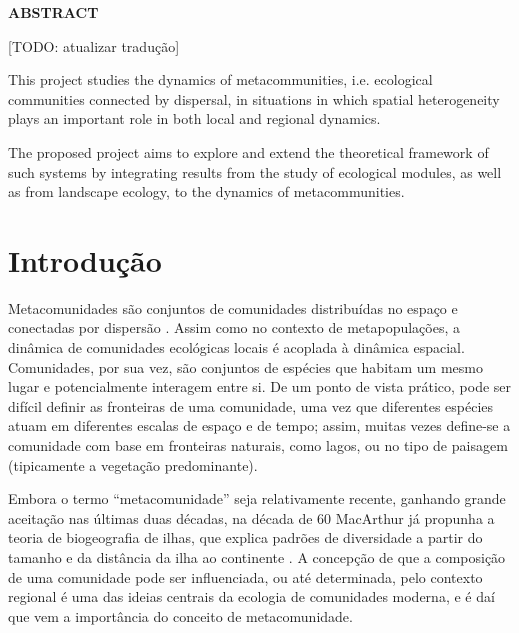 \documentclass[12pt]{extarticle}
\begin{document}
\newpage

\setlength{\parindent}{20pt}
\thispagestyle{empty}
\begin{center}
    \bf \Large \color{blue} ABSTRACT
\end{center}
\vskip 3.0cm
{\it

    [TODO: atualizar tradução]

    This project studies the dynamics of metacommunities, i.e.
    ecological communities connected by dispersal, in situations in which
    spatial heterogeneity plays an important role in both local and regional
    dynamics.

    The proposed project aims to explore and extend the theoretical framework
    of such systems by integrating results from the study of ecological modules,
    as well as from landscape ecology, to the dynamics of metacommunities.
}

\newpage
\setcounter{page}{1}
\onehalfspacing

\section{Introdução}

Metacomunidades são conjuntos de comunidades distribuídas no espaço e
conectadas por dispersão \citep{hanski1991, holyoak2005}. Assim como no
contexto de metapopulações, a dinâmica de comunidades ecológicas locais é
acoplada à dinâmica espacial.  Comunidades, por sua vez, são conjuntos de
espécies que habitam um mesmo lugar e potencialmente interagem entre si. De um
ponto de vista prático, pode ser difícil definir as fronteiras de uma
comunidade, uma vez que diferentes espécies atuam em diferentes escalas de
espaço e de tempo; assim, muitas vezes define-se a comunidade com base em
fronteiras naturais, como lagos, ou no tipo de paisagem (tipicamente a
vegetação predominante).

Embora o termo ``metacomunidade'' seja relativamente recente, ganhando grande
aceitação nas últimas duas décadas, na década de 60 MacArthur já propunha a
teoria de biogeografia de ilhas, que explica padrões de diversidade a partir
do tamanho e da distância da ilha ao continente \citep{macarthur1967}. A
concepção de que a composição de uma comunidade pode ser influenciada, ou até
determinada, pelo contexto regional é uma das ideias centrais da ecologia de
comunidades moderna, e é daí que vem a importância do conceito de
metacomunidade.
\end{document}
